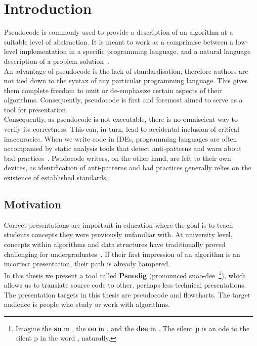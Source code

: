 \chapter{Introduction}

Pseudocode is commonly used to provide a description of an algorithm at a suitable level of abstraction. It is meant to work as a comprimise between a low-level implementation in a specific programming language, and a natural language description of a problem solution~\cite{whatIsPseudocode}. \\

An advantage of pseudocode is the lack of standardisation, therefore authors are not tied down to the syntax of any particular programming language. This gives them complete freedom to omit or de-emphasize certain aspects of their algorithms. Consequently, pseudocode is first and foremost aimed to serve as a tool for presentation. \\

Consequently, as pseudocode is not executable, there is no omniscient way to verify its correctness. This can, in turn, lead to accidental inclusion of critical inaccuracies. %
When we write code in IDEs, programming languages are often accompanied by static analysis tools that detect anti-patterns and warn about bad practices~\cite{manyLinters, whatIsALinter}. Psudocode writers, on the other hand, are left to their own devices, as identification of anti-patterns and bad practices generally relies on the existence of established standards. \\


\section{Motivation}

Correct presentations are important in education where the goal is to teach students concepts they were previously unfamiliar with. At university level, concepts within algorithms and data structures have traditionally proved challenging for undergraduates~\cite{algorithmsAreHard1, algorithmsAreHard2}. If their first impression of an algorithm is an incorrect presentation, their path is already hampered. \\

In this thesis we present a tool called \textbf{Psnodig} (pronounced snoo-dee~\footnote{Imagine the \textbf{sn} in , the \textbf{oo} in , and the \textbf{dee} in . The silent \textbf{p} is an ode to the silent p in the word , naturally.}), which allows us to translate source code to other, perhaps less technical presentations. The presentation targets in this thesis are pseudocode and flowcharts. The target audience is people who study or work with algorithms. \\

